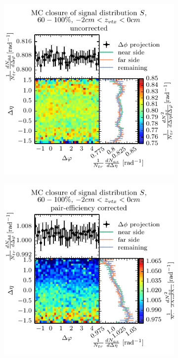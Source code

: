 \begin{figure}
  \centering
  \begin{subfigure}[b]{0.5\textwidth}
    \includegraphics[width=\textwidth]{figures/closure_S_peri_no_st.pdf}
  \end{subfigure}%
  \begin{subfigure}[b]{0.5\textwidth}
    \includegraphics[width=\textwidth]{figures/closure_S_peri_st.pdf}

\end{subfigure}
\end{figure}
